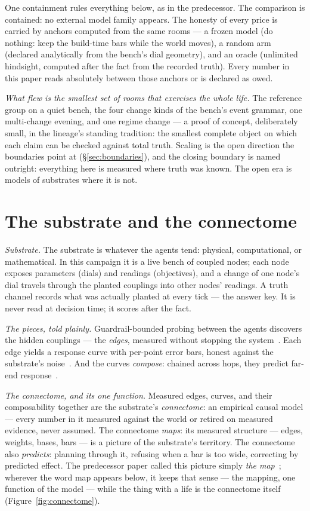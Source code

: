 \documentclass[11pt,a4paper]{article}
\begin{document}
One containment rules everything below, as in the predecessor. The
comparison is contained: no external model family appears. The honesty
of every price is carried by anchors computed from the same rooms ---
a frozen model (do nothing: keep the build-time bars while the world
moves), a random arm (declared analytically from the bench's dial
geometry), and an oracle (unlimited hindsight, computed after the fact
from the recorded truth). Every number in this paper reads absolutely
between those anchors or is declared as owed.

\emph{What flew is the smallest set of rooms that exercises the whole
life.} The reference group on a quiet bench, the four change kinds of
the bench's event grammar, one multi-change evening, and one regime
change --- a proof of concept, deliberately small, in the lineage's
standing tradition: the smallest complete object on which each claim
can be checked against total truth. Scaling is the open direction the
boundaries point at (\S\ref{sec:boundaries}), and the closing
boundary is named outright: everything here is measured where truth
was known. The open era is models of substrates where it is not.

\section{The substrate and the connectome}
\label{sec:orientation}

\emph{Substrate.} The substrate is whatever the agents tend:
physical, computational, or mathematical. In this campaign it is a
live bench of coupled nodes; each node exposes parameters (dials) and
readings (objectives), and a change of one node's dial travels
through the planted couplings into other nodes' readings. A truth
channel records what was actually planted at every tick --- the
answer key. It is never read at decision time; it scores after the
fact.

\emph{The pieces, told plainly.} Guardrail-bounded probing between
the agents discovers the hidden couplings --- the \emph{edges},
measured without stopping the system~\cite{p1}. Each edge yields a
response curve with per-point error bars, honest against the
substrate's noise~\cite{p2}. And the curves \emph{compose}: chained
across hops, they predict far-end response~\cite{p3}.

\emph{The connectome, and its one function.} Measured edges, curves,
and their composability together are the substrate's
\emph{connectome}: an empirical causal model --- every number in it
measured against the world or retired on measured evidence, never
assumed. The connectome \emph{maps}: its measured structure --- edges,
weights, bases, bars --- is a picture of the substrate's territory.
The connectome also \emph{predicts}: planning through it, refusing
when a bar is too wide, correcting by predicted effect. The
predecessor paper called this picture simply \emph{the
map}~\cite{p4}; wherever the word map appears below, it keeps that
sense --- the mapping, one function of the model --- while the thing
with a life is the connectome itself
(Figure~\ref{fig:connectome}).
\end{document}
